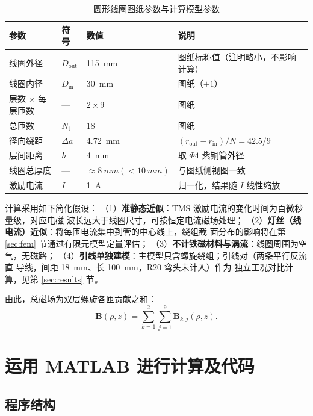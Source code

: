 \documentclass[zihao=-4,a4paper]{ctexart}
\numberwithin{figure}{section}
\numberwithin{table}{section}
\numberwithin{equation}{section}
\begin{document}
\begin{table}[htbp]
  \centering
  \caption{圆形线圈图纸参数与计算模型参数}
  \label{tab:param}
  \begin{tabular}{llll}
    \toprule
    参数 & 符号 & 数值 & 说明 \\
    \midrule
    线圈外径 & $D_\mathrm{out}$ & \SI{115}{mm} & 图纸标称值（注明略小，不影响计算） \\
    线圈内径 & $D_\mathrm{in}$  & \SI{30}{mm}  & 图纸（$\pm 1$） \\
    层数 $\times$ 每层匝数 & --- & $2\times 9$ & 图纸 \\
    总匝数 & $N_\mathrm{t}$ & 18 & 图纸 \\
    径向绕距 & $\Delta a$ & \SI{4.72}{mm} & $(r_\mathrm{out}-r_\mathrm{in})/N = 42.5/9$ \\
    层间距离 & $h$ & \SI{4}{mm} & 取 $\Phi 4$ 紫铜管外径 \\
    线圈总厚度 & --- & $\approx\SI{8}{mm}(<\SI{10}{mm})$ & 与图纸侧视图一致 \\
    激励电流 & $I$ & \SI{1}{A} & 归一化，结果随 $I$ 线性缩放 \\
    \bottomrule
  \end{tabular}
\end{table}

计算采用如下简化假设：
（1）\textbf{准静态近似}：TMS 激励电流的变化时间为百微秒量级，对应电磁
波长远大于线圈尺寸，可按恒定电流磁场处理；
（2）\textbf{灯丝（线电流）近似}：将每匝电流集中到管的中心线上，绕组截
面分布的影响将在第 \ref{sec:fem} 节通过有限元模型定量评估；
（3）\textbf{不计铁磁材料与涡流}：线圈周围为空气，无磁路；
（4）\textbf{引线单独建模}：主模型只含螺旋绕组；引线对（两条平行反流直
导线，间距 \SI{18}{mm}、长 \SI{100}{mm}，$\mathrm{R}20$ 弯头未计入）作为
独立工况对比计算，见第 \ref{sec:results} 节。

由此，总磁场为双层螺旋各匝贡献之和：
\begin{equation}
  \boldsymbol{B}(\rho,z) = \sum_{k=1}^{2}\sum_{j=1}^{9} \boldsymbol{B}_{k,j}(\rho,z).
  \label{eq:superpose}
\end{equation}

\clearpage
\section{运用 MATLAB 进行计算及代码}\label{sec:matlab}

\subsection{程序结构}
\end{document}
